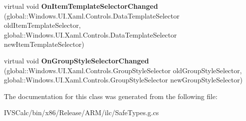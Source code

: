 \begin{DoxyCompactItemize}
\item 
\mbox{\label{class_windows_1_1_u_i_1_1_xaml_1_1_controls_1_1_items_control_af6a143834a45fdc2422edde6c8dbe3dd}} 
virtual void {\bfseries On\+Item\+Template\+Selector\+Changed} (global\+::\+Windows.\+U\+I.\+Xaml.\+Controls.\+Data\+Template\+Selector old\+Item\+Template\+Selector, global\+::\+Windows.\+U\+I.\+Xaml.\+Controls.\+Data\+Template\+Selector new\+Item\+Template\+Selector)
\item 
\mbox{\label{class_windows_1_1_u_i_1_1_xaml_1_1_controls_1_1_items_control_adea6b7c5dc22e6a94522e632340290be}} 
virtual void {\bfseries On\+Group\+Style\+Selector\+Changed} (global\+::\+Windows.\+U\+I.\+Xaml.\+Controls.\+Group\+Style\+Selector old\+Group\+Style\+Selector, global\+::\+Windows.\+U\+I.\+Xaml.\+Controls.\+Group\+Style\+Selector new\+Group\+Style\+Selector)
\end{DoxyCompactItemize}


The documentation for this class was generated from the following file\+:\begin{DoxyCompactItemize}
\item 
I\+V\+S\+Calc/bin/x86/\+Release/\+A\+R\+M/ilc/Safe\+Types.\+g.\+cs\end{DoxyCompactItemize}
